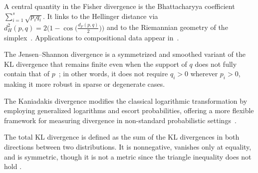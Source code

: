 \documentclass[preprint,12pt]{elsarticle}
\newcommand{\blue}{\color{blue}}
\begin{document}
A central quantity in the Fisher divergence is the Bhattacharyya coefficient 
$\sum_{i=1}^s \sqrt{p_i q_i}$. 
It links to the Hellinger distance via 
$d_H^2(p,q)=2\bigl(1-\cos\bigl(\tfrac{d_F(p,q)}{2}\bigr)\bigr)$
and to the Riemannian geometry of the simplex~\citep{amari2016information,bhattacharyya1943measure}.
Applications to compositional data appear in~\citep{erb2021information}.



The Jensen–Shannon divergence is a symmetrized and smoothed variant of the KL divergence that remains finite even when the support of 
$q$ does not fully contain that of $p$~\cite{lin1991divergence}; in other words, it does not require 
$q_i>0$
wherever 
$p_i>0$, making it more robust in sparse or degenerate cases.


The Kaniadakis divergence modifies the classical logarithmic transformation by employing generalized logarithms and escort probabilities, offering a more flexible framework for measuring divergence in non-standard probabilistic settings~\cite{pistone2023kaniadakis, naudts2008generalised}.

The total KL divergence is defined as the sum of the KL divergences in both directions between two distributions. It is nonnegative, vanishes only at equality, and is symmetric, though it is not a metric since the triangle inequality does not hold \citep{amari2016information}. 

\end{document}
